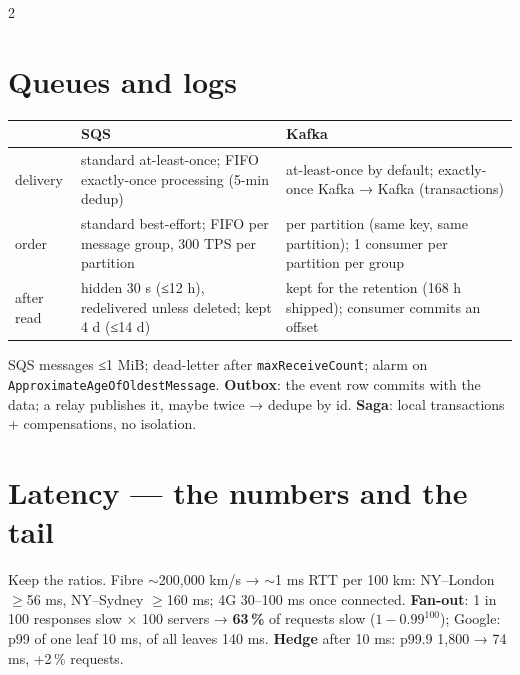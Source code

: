 \documentclass[8pt]{extarticle}
\newcommand\ct[1]{\texttt{#1}}
\begin{document}
\begin{multicols}{2}
\section{Queues and logs}
{\scriptsize\setlength{\tabcolsep}{3pt}
\begin{tabular}{@{}>{\raggedright\arraybackslash}p{9mm}>{\raggedright\arraybackslash}p{33mm}>{\raggedright\arraybackslash}p{32mm}@{}}
\toprule
& \textbf{SQS} & \textbf{Kafka}\\
\midrule
delivery & standard at-least-once; FIFO exactly-once processing (5-min dedup) & at-least-once by default; exactly-once Kafka → Kafka (transactions)\\
order & standard best-effort; FIFO per message group, 300 TPS per partition & per partition (same key, same partition); 1 consumer per partition per group\\
after read & hidden 30 s (≤12 h), redelivered unless deleted; kept 4 d (≤14 d) & kept for the retention (168 h shipped); consumer commits an offset\\
\bottomrule
\end{tabular}}\par
SQS messages ≤1 MiB; dead-letter after \ct{maxReceiveCount}; alarm on
\ct{ApproximateAgeOfOldestMessage}. \textbf{Outbox}: the event row commits with the data; a relay
publishes it, maybe twice → dedupe by id. \textbf{Saga}: local transactions + compensations, no
isolation.

\section{Latency — the numbers and the tail}
\noindent{}\par
Keep the ratios. Fibre $\sim$200,000 km/s → $\sim$1 ms RTT per 100 km: NY–London
$\geq$56 ms, NY–Sydney $\geq$160 ms; 4G 30–100 ms once connected. \textbf{Fan-out}: 1 in 100
responses slow × 100 servers → \textbf{63\,\%} of requests slow ($1-0.99^{100}$); Google: p99 of one
leaf 10 ms, of all leaves 140 ms. \textbf{Hedge} after 10 ms: p99.9 1,800 → 74 ms, +2\,\% requests.


\end{multicols}
\end{document}
